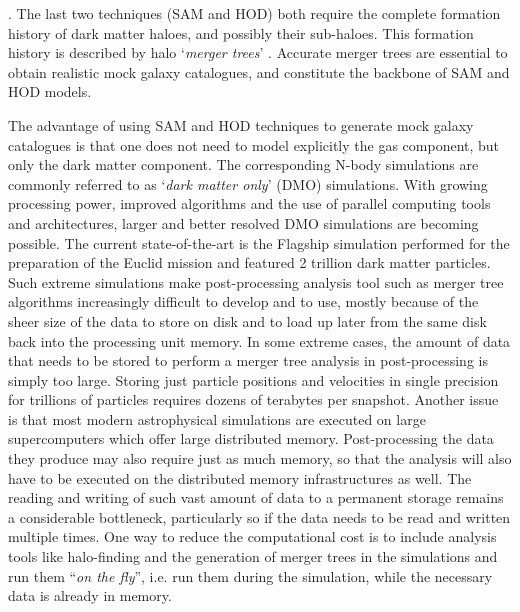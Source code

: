 \documentclass[a4paper,twocolumn,fleqn,usenatbib]{mnras}
\providecommand{\DIFaddbegin}{} %
\providecommand{\DIFaddend}{} %
\providecommand{\DIFdelend}{} %
\newcommand{\DIFaddincludegraphics}[2][]{{\color{blue}\fbox{\DIFOincludegraphics[#1]{#2}}}} %
\DeclareRobustCommand{\DIFaddbegin}{\DIFOaddbegin \let\includegraphics\DIFaddincludegraphics} %
\DeclareRobustCommand{\DIFaddend}{\DIFOaddend \let\includegraphics\DIFOincludegraphics} %
\DeclareRobustCommand{\DIFdelend}{\DIFOaddend \let\includegraphics\DIFOincludegraphics} %
\begin{document}
\DIFdelend \DIFaddbegin \citep[e.g.][]{HOD-Seljak, HOD-Berlind,
  peacockHaloOccupationNumbers2000,
  bensonNatureGalaxyBias2000,wechslerGalaxyFormationConstraints2001,
  scoccimarroHowManyGalaxies2001}\DIFaddend .
The last two techniques (SAM and HOD) both require the complete 
formation history of dark matter
haloes, and possibly their sub-haloes. This formation history is
described by halo `\emph{merger trees}'
\citep{roukemaSpectralEvolutionMerging1993,
  roukemaFailureSimpleMerging1993, laceyMergerRatesHierarchical1993}.
Accurate merger trees are essential to obtain realistic mock galaxy
catalogues, and constitute the backbone of SAM and HOD models.


The advantage of using SAM and HOD techniques to generate mock galaxy
catalogues is that one does not need to model explicitly the gas
component, but only the dark matter component.  The corresponding
N-body simulations are commonly referred to as `\emph{dark matter
only}' (DMO) simulations.  With growing processing power, improved
algorithms and the use of parallel computing tools and architectures,
larger and better resolved DMO simulations are becoming possible.  The
current state-of-the-art is the Flagship simulation performed for the
preparation of the Euclid mission \citep{PKDGRAV} and featured 2
trillion dark matter particles.  Such extreme simulations make
post-processing analysis tool such as merger tree algorithms
increasingly difficult to develop and to use, mostly because of the
sheer size of the data to store on disk and to load up later from the
same disk back into the processing unit memory.  In some extreme
cases, the amount of data that needs to be stored to perform a merger
tree analysis in post-processing is simply too large.  Storing just
particle positions and velocities in single precision for trillions of
particles requires dozens of terabytes per snapshot.  Another issue is
that most modern astrophysical simulations are executed on large
supercomputers which offer large distributed memory.  Post-processing
the data they produce may also require just as much memory, so that
the analysis will also have to be executed on the distributed memory
infrastructures as well.  The reading and writing of such vast amount
of data to a permanent storage remains a considerable bottleneck,
particularly so if the data needs to be read and written multiple
times.  One way to reduce the computational cost is to include
analysis tools like halo-finding and the generation of merger trees in
the simulations and run them ``\textit{on the fly}'', i.e. run them
during the simulation, while the necessary data is already in memory.
\end{document}
